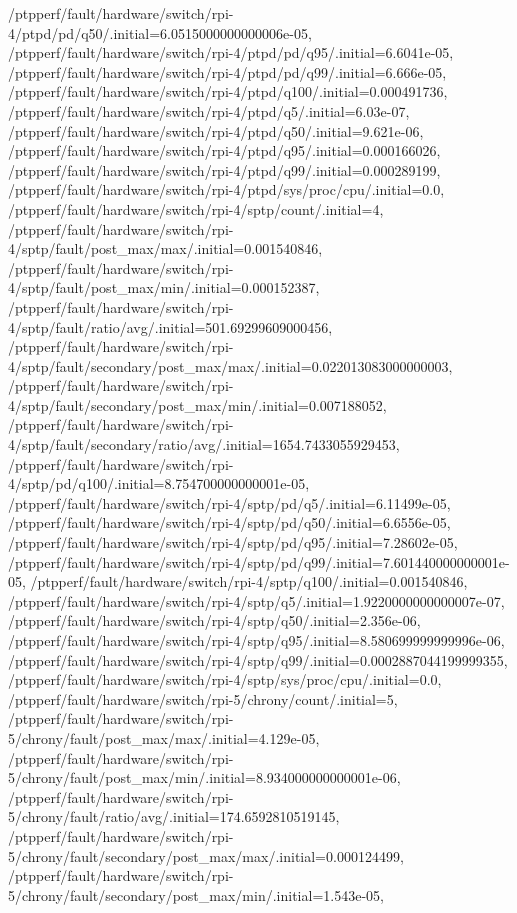 {    /ptpperf/fault/hardware/switch/rpi-4/ptpd/pd/q50/.initial=6.0515000000000006e-05,
    /ptpperf/fault/hardware/switch/rpi-4/ptpd/pd/q95/.initial=6.6041e-05,
    /ptpperf/fault/hardware/switch/rpi-4/ptpd/pd/q99/.initial=6.666e-05,
    /ptpperf/fault/hardware/switch/rpi-4/ptpd/q100/.initial=0.000491736,
    /ptpperf/fault/hardware/switch/rpi-4/ptpd/q5/.initial=6.03e-07,
    /ptpperf/fault/hardware/switch/rpi-4/ptpd/q50/.initial=9.621e-06,
    /ptpperf/fault/hardware/switch/rpi-4/ptpd/q95/.initial=0.000166026,
    /ptpperf/fault/hardware/switch/rpi-4/ptpd/q99/.initial=0.000289199,
    /ptpperf/fault/hardware/switch/rpi-4/ptpd/sys/proc/cpu/.initial=0.0,
    /ptpperf/fault/hardware/switch/rpi-4/sptp/count/.initial=4,
    /ptpperf/fault/hardware/switch/rpi-4/sptp/fault/post_max/max/.initial=0.001540846,
    /ptpperf/fault/hardware/switch/rpi-4/sptp/fault/post_max/min/.initial=0.000152387,
    /ptpperf/fault/hardware/switch/rpi-4/sptp/fault/ratio/avg/.initial=501.69299609000456,
    /ptpperf/fault/hardware/switch/rpi-4/sptp/fault/secondary/post_max/max/.initial=0.022013083000000003,
    /ptpperf/fault/hardware/switch/rpi-4/sptp/fault/secondary/post_max/min/.initial=0.007188052,
    /ptpperf/fault/hardware/switch/rpi-4/sptp/fault/secondary/ratio/avg/.initial=1654.7433055929453,
    /ptpperf/fault/hardware/switch/rpi-4/sptp/pd/q100/.initial=8.754700000000001e-05,
    /ptpperf/fault/hardware/switch/rpi-4/sptp/pd/q5/.initial=6.11499e-05,
    /ptpperf/fault/hardware/switch/rpi-4/sptp/pd/q50/.initial=6.6556e-05,
    /ptpperf/fault/hardware/switch/rpi-4/sptp/pd/q95/.initial=7.28602e-05,
    /ptpperf/fault/hardware/switch/rpi-4/sptp/pd/q99/.initial=7.601440000000001e-05,
    /ptpperf/fault/hardware/switch/rpi-4/sptp/q100/.initial=0.001540846,
    /ptpperf/fault/hardware/switch/rpi-4/sptp/q5/.initial=1.9220000000000007e-07,
    /ptpperf/fault/hardware/switch/rpi-4/sptp/q50/.initial=2.356e-06,
    /ptpperf/fault/hardware/switch/rpi-4/sptp/q95/.initial=8.580699999999996e-06,
    /ptpperf/fault/hardware/switch/rpi-4/sptp/q99/.initial=0.0002887044199999355,
    /ptpperf/fault/hardware/switch/rpi-4/sptp/sys/proc/cpu/.initial=0.0,
    /ptpperf/fault/hardware/switch/rpi-5/chrony/count/.initial=5,
    /ptpperf/fault/hardware/switch/rpi-5/chrony/fault/post_max/max/.initial=4.129e-05,
    /ptpperf/fault/hardware/switch/rpi-5/chrony/fault/post_max/min/.initial=8.934000000000001e-06,
    /ptpperf/fault/hardware/switch/rpi-5/chrony/fault/ratio/avg/.initial=174.6592810519145,
    /ptpperf/fault/hardware/switch/rpi-5/chrony/fault/secondary/post_max/max/.initial=0.000124499,
    /ptpperf/fault/hardware/switch/rpi-5/chrony/fault/secondary/post_max/min/.initial=1.543e-05,
}
